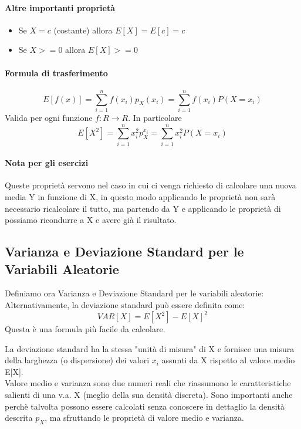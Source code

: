 \paragraph{Altre importanti proprietà}
\begin{itemize}
	\item Se $X = c$ (costante) allora $E[X] = E[c] = c$
	\item Se $X >= 0$ allora $E[X] >= 0$
\end{itemize}

\paragraph{Formula di trasferimento}
\begin{equation}
	E[f(x)] = \sum_{i = 1}^{n} f(x_i)p_X(x_i)
	= \sum_{i = 1}^{n}f(x_i)P(X = x_i)
\end{equation}
Valida per ogni funzione $f:R \to R$. In particolare
\begin{equation}
	E[X^2] = \sum_{i = 1}^{n} x_i^2 p_X^{x_i} = \sum_{i = 1}^{n} x_i^2P(X=x_i)
\end{equation}

\paragraph*{Nota per gli esercizi} Queste proprietà servono nel caso in cui ci venga
richiesto di calcolare una nuova media Y in funzione di X, in questo modo applicando
le proprietà non sarà necessario ricalcolare il tutto, ma partendo da Y e applicando
le proprietà di possiamo ricondurre a X e avere già il risultato.

\subsection[Varianza e Deviazione Standard]{Varianza e Deviazione Standard per le Variabili Aleatorie}
Definiamo ora Varianza e Deviazione Standard per le variabili aleatorie:
Alternativamente, la deviazione standard può essere definita come:
\[ VAR[X] = E[X^2] - E[X]^2 \]
Questa è una formula più facile da calcolare.

La deviazione standard ha la stessa "unità di misura" di X e fornisce
una misura della larghezza (o dispersione) dei valori $x_i$ assunti da X rispetto
al valore medio E[X].
\\Valore medio e varianza sono due numeri reali che riassumono
le caratteristiche salienti di una v.a. X (meglio della sua densità discreta).
Sono importanti anche perchè talvolta possono essere calcolati
senza conoscere in dettaglio la densità descrita $p_X$, ma sfruttando le
proprietà di valore medio e varianza.

